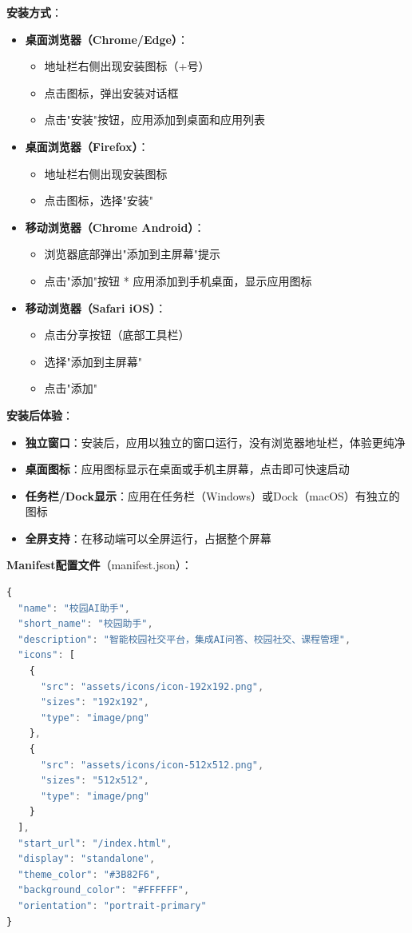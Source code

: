 \documentclass[12pt,a4paper]{article}
\begin{document}
\textbf{安装方式}：
\begin{itemize}
    \item \textbf{桌面浏览器（Chrome/Edge）}：
        \begin{itemize}
            \item 地址栏右侧出现安装图标（+号）
            \item 点击图标，弹出安装对话框
            \item 点击"安装"按钮，应用添加到桌面和应用列表
        \end{itemize}
    \item \textbf{桌面浏览器（Firefox）}：
        \begin{itemize}
            \item 地址栏右侧出现安装图标
            \item 点击图标，选择"安装"
        \end{itemize}
    \item \textbf{移动浏览器（Chrome Android）}：
        \begin{itemize}
            \item 浏览器底部弹出"添加到主屏幕"提示
            \item 点击"添加"按钮
            * 应用添加到手机桌面，显示应用图标
        \end{itemize}
    \item \textbf{移动浏览器（Safari iOS）}：
        \begin{itemize}
            \item 点击分享按钮（底部工具栏）
            \item 选择"添加到主屏幕"
            \item 点击"添加"
        \end{itemize}
\end{itemize}

\textbf{安装后体验}：
\begin{itemize}
    \item \textbf{独立窗口}：安装后，应用以独立的窗口运行，没有浏览器地址栏，体验更纯净
    \item \textbf{桌面图标}：应用图标显示在桌面或手机主屏幕，点击即可快速启动
    \item \textbf{任务栏/Dock显示}：应用在任务栏（Windows）或Dock（macOS）有独立的图标
    \item \textbf{全屏支持}：在移动端可以全屏运行，占据整个屏幕
\end{itemize}

\textbf{Manifest配置文件}（manifest.json）：
\begin{lstlisting}[language=JavaScript]
{
  "name": "校园AI助手",
  "short_name": "校园助手",
  "description": "智能校园社交平台，集成AI问答、校园社交、课程管理",
  "icons": [
    {
      "src": "assets/icons/icon-192x192.png",
      "sizes": "192x192",
      "type": "image/png"
    },
    {
      "src": "assets/icons/icon-512x512.png",
      "sizes": "512x512",
      "type": "image/png"
    }
  ],
  "start_url": "/index.html",
  "display": "standalone",
  "theme_color": "#3B82F6",
  "background_color": "#FFFFFF",
  "orientation": "portrait-primary"
}
\end{lstlisting}
\end{document}
